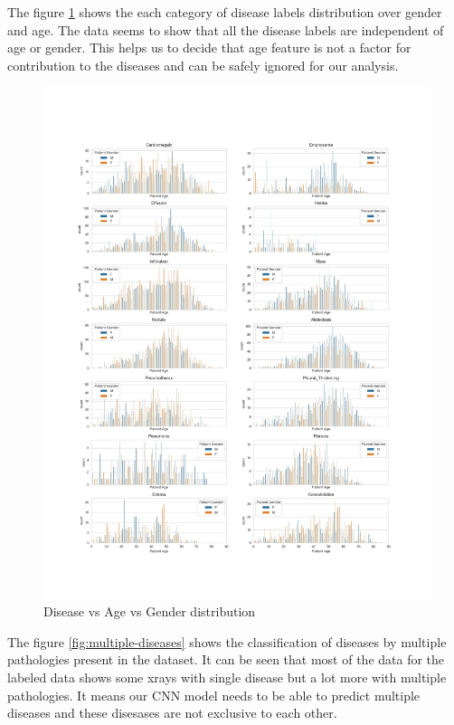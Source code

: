 \documentclass{article}
\begin{document}
    The figure \ref{fig:disease-age-vs-gender} shows the each category of disease labels distribution over gender and age. The data seems to show that all the disease labels are independent of age or gender. This helps us to decide that age feature is not a factor for contribution to the diseases and can be safely ignored for our analysis.

    \begin{figure}
        \includegraphics[width=\linewidth]{./images/disease_age_gender_distribution.jpg}
        \caption{Disease vs Age vs Gender distribution}
        \label{fig:disease-age-vs-gender}
    \end{figure}

    The figure \ref{fig:multiple-diseases} shows the classification of diseases by multiple pathologies present in the dataset. It can be seen that most of the data for the labeled data shows some xrays with single disease but a lot more with multiple pathologies. It means our CNN model needs to be able to predict multiple diseases and these disesases are not exclusive to each other.
\end{document}
